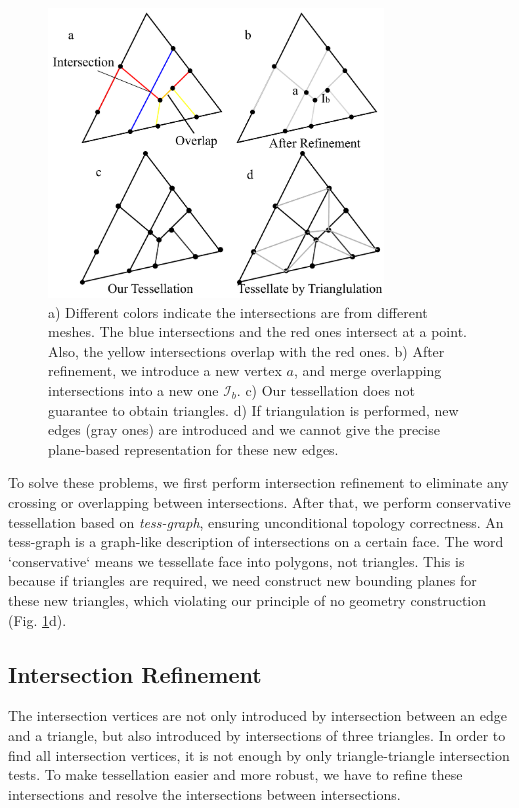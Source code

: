\documentclass[10pt,journal,compsoc]{IEEEtran}
\begin{document}
\begin{figure}[t]
\centering
\includegraphics[width=3.5in]{iisect}
\caption{a) Different colors indicate the intersections are from different meshes. The blue intersections and the red ones intersect at a point. Also, the yellow intersections overlap with the red ones. b) After refinement, we introduce a new vertex $a$, and merge overlapping intersections into a new one $\mathcal{I}_b$. c) Our tessellation does not guarantee to obtain triangles. d) If triangulation is performed, new edges (gray ones) are introduced and we cannot give the precise plane-based representation for these new edges.}
\label{fig:iisect}
\end{figure}

To solve these problems, we first perform intersection refinement to eliminate any crossing or overlapping between intersections. After that, we perform conservative tessellation based on \emph{tess-graph}, ensuring unconditional topology correctness. An tess-graph is a graph-like description of intersections on a certain face. The word `conservative` means we tessellate face into polygons, not triangles. This is because if triangles are required, we need construct new bounding planes for these new triangles, which violating our principle of no geometry construction (Fig. \ref{fig:iisect}d).

\subsection{Intersection Refinement}


The intersection vertices are not only introduced by intersection between an edge and a triangle, but also introduced by intersections of three triangles. In order to find all intersection vertices, it is not enough by only triangle-triangle intersection tests. To make tessellation easier and more robust, we have to refine these intersections and resolve the intersections between intersections.
\end{document}
